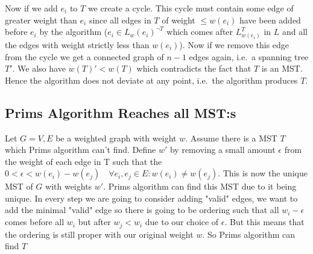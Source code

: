 \documentclass[nobib]{tufte-handout}
\begin{document}
            Now if we add $e_i$ to $T$ we create a cycle. This cycle must contain some edge of greater weight than $e_i$ since all edges in $T$ of weight $\leq w(e_i)$ have been added before $e_i$ by the algorithm ($e_i \in L_w(e_i)^{\neg T}$ which comes after $L_{w(e_i)}^T$ in $L$ and all the edges with weight strictly less than $w(e_i)$). Now if we remove this edge from the cycle we get a connected graph of $n - 1$ edges again, i.e.\ a spanning tree $T'$. We also have $w(T)' < w(T)$ which contradicts the fact that $T$ is an MST. Hence the algorithm does not deviate at any point, i.e.\ the algorithm produces $T$.

            
        
\subsection{Prims Algorithm Reaches all MST:s}

Let \(G={V,E} \) be a weighted graph with weight \( w \). Assume there is a MST \( T \) which Prims algorithm can't find. Define \( w' \) by removing a small amount \( \epsilon \) from the weight of each edge in T such that the \( 0<\epsilon<w(e_i)-w(e_j) \quad \forall e_i, e_j \in E: w(e_i)\neq w(e_j)\). This is now the unique MST of \(G \) with weights \( w' \). Prims algorithm can find this MST due to it being unique. In every step we are going to consider adding "valid" edges, we want to add the minimal "valid" edge so there is going to be ordering such that all \( w_i-\epsilon \) comes before all \( w_i\) but after \( w_j<w_i \) due to our choice of \( \epsilon \). But this means that the ordering is still proper with our original weight \( w \). So Prims algorithm can find \( T \quad \) %
\end{document}
